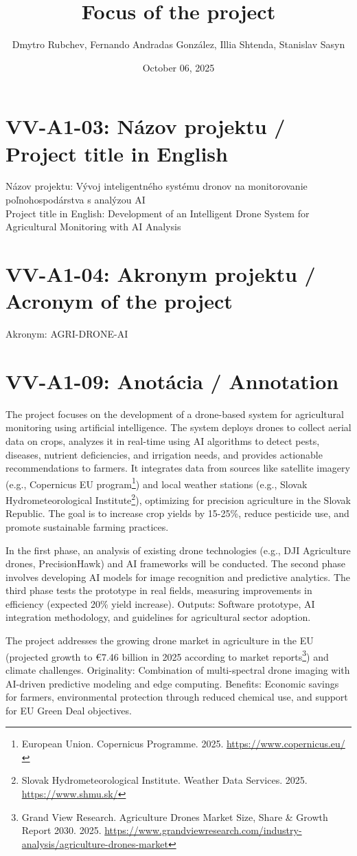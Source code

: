 \documentclass[12pt]{article}
\title{Focus of the project}
\author{Dmytro Rubchev, Fernando Andradas González, Illia Shtenda, Stanislav Sasyn}
\date{October 06, 2025}
\begin{document}
\maketitle

\section*{VV-A1-03: Názov projektu / Project title in English}

Názov projektu: Vývoj inteligentného systému dronov na monitorovanie poľnohospodárstva s analýzou AI \\
Project title in English: Development of an Intelligent Drone System for Agricultural Monitoring with AI Analysis

\section*{VV-A1-04: Akronym projektu / Acronym of the project}

Akronym: AGRI-DRONE-AI

\section*{VV-A1-09: Anotácia / Annotation}

The project focuses on the development of a drone-based system for agricultural monitoring using artificial intelligence. The system deploys drones to collect aerial data on crops, analyzes it in real-time using AI algorithms to detect pests, diseases, nutrient deficiencies, and irrigation needs, and provides actionable recommendations to farmers. It integrates data from sources like satellite imagery (e.g., Copernicus EU program\footnote{European Union. Copernicus Programme. 2025. \url{https://www.copernicus.eu/}}) and local weather stations (e.g., Slovak Hydrometeorological Institute\footnote{Slovak Hydrometeorological Institute. Weather Data Services. 2025. \url{https://www.shmu.sk/}}), optimizing for precision agriculture in the Slovak Republic. The goal is to increase crop yields by 15-25\%, reduce pesticide use, and promote sustainable farming practices.

In the first phase, an analysis of existing drone technologies (e.g., DJI Agriculture drones, PrecisionHawk) and AI frameworks will be conducted. The second phase involves developing AI models for image recognition and predictive analytics. The third phase tests the prototype in real fields, measuring improvements in efficiency (expected 20\% yield increase). Outputs: Software prototype, AI integration methodology, and guidelines for agricultural sector adoption.

The project addresses the growing drone market in agriculture in the EU (projected growth to €7.46 billion in 2025 according to market reports\footnote{Grand View Research. Agriculture Drones Market Size, Share \& Growth Report 2030. 2025. \url{https://www.grandviewresearch.com/industry-analysis/agriculture-drones-market}}) and climate challenges. Originality: Combination of multi-spectral drone imaging with AI-driven predictive modeling and edge computing. Benefits: Economic savings for farmers, environmental protection through reduced chemical use, and support for EU Green Deal objectives.
\end{document}
